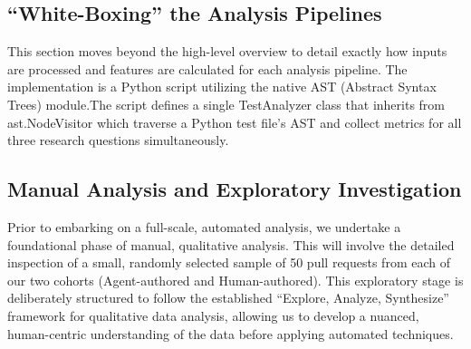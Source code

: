 \documentclass[conference]{IEEEtran}
\begin{document}
\subsection{``White-Boxing'' the Analysis Pipelines}
This section moves beyond the high-level overview to detail exactly how inputs are processed and features are calculated for each analysis pipeline. The implementation is a Python script utilizing the native AST (Abstract Syntax Trees) module.The script defines a single TestAnalyzer class that inherits from ast.NodeVisitor which traverse a Python test file's AST and collect metrics for all three research questions simultaneously.

\subsection{Manual Analysis and Exploratory Investigation}
\label{ssec:explore and investigation}
Prior to embarking on a full-scale, automated analysis, we  undertake a foundational phase of manual, qualitative analysis. This will involve the detailed inspection of a small, randomly selected sample of 50 pull requests from each of our two cohorts (Agent-authored and Human-authored). This exploratory stage is deliberately structured to follow the established ``Explore, Analyze, Synthesize'' framework for qualitative data analysis, allowing us to develop a nuanced, human-centric understanding of the data before applying automated techniques. %

\end{document}
